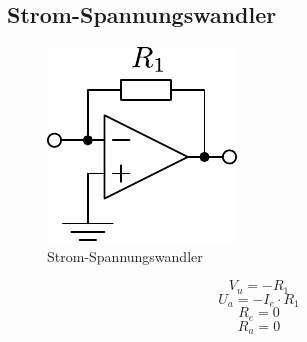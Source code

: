 



\subsection{Strom-Spannungswandler}
\begin{figure}[h!]
	\centering
	\includegraphics[scale=\schscale]{op_iu.pdf}
	\caption{Strom-Spannungswandler}
	\label{sch:op-iu}
\end{figure}
\[ V_u = - R_1 \]
\[ U_a = - I_e \cdot R_1 \]
\[ R_e = 0 \]
\[ R_a = 0 \]